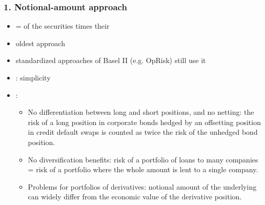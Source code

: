 \subsubsection*{1. Notional-amount approach}
\begin{itemize}[leftmargin=*]
    \item {} =  of the securities times their 
    \item oldest approach
    \item standardized approaches of Basel II (e.g. OpRisk) still use it
    \item {}: simplicity
    \item {}:
    \begin{itemize}[leftmargin=*]
    \item No differentiation between long and short positions, and no netting: the risk of a long position in
corporate bonds hedged by an offsetting position in credit default swaps is counted as twice the risk
of the unhedged bond position.
    \item No diversification benefits: risk of a portfolio of loans to many companies = risk of a portfolio
where the whole amount is lent to a single company.
    \item Problems for portfolios of derivatives: notional amount of the underlying can widely differ from the
economic value of the derivative position.
\end{itemize}
\end{itemize}

